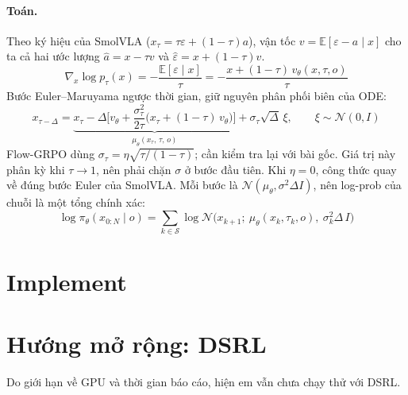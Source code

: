 \documentclass[11pt,a4paper]{article}
\newcommand{\Normal}{\mathcal{N}}
\newcommand{\Sset}{\mathcal{S}}
\begin{document}
\paragraph{Toán.}
Theo ký hiệu của SmolVLA ($x_\tau = \tau\varepsilon + (1 - \tau)a$), vận tốc $v = \mathbb{E}[\varepsilon - a \mid x]$ cho ta cả hai ước lượng $\hat a = x - \tau v$ và $\hat\varepsilon = x + (1 - \tau)v$.
\begin{equation}
  \nabla_x \log p_\tau(x) = -\frac{\mathbb{E}[\varepsilon \mid x]}{\tau} = -\frac{x + (1-\tau)\,v_\theta(x,\tau,o)}{\tau}
\end{equation}
Bước Euler--Maruyama ngược thời gian, giữ nguyên phân phối biên của ODE:
\begin{equation}
  x_{\tau-\Delta} = \underbrace{x_\tau - \Delta\Big[v_\theta + \frac{\sigma_\tau^2}{2\tau}\big(x_\tau + (1-\tau)\,v_\theta\big)\Big]}_{\mu_\theta(x_\tau,\,\tau,\,o)} + \sigma_\tau\sqrt{\Delta}\,\xi, \qquad \xi \sim \Normal(0, I)
\end{equation}
Flow-GRPO dùng $\sigma_\tau = \eta\sqrt{\tau/(1 - \tau)}$; cần kiểm tra lại với bài gốc. Giá trị này phân kỳ khi $\tau \to 1$, nên phải chặn $\sigma$ ở bước đầu tiên. Khi $\eta = 0$, công thức quay về đúng bước Euler của SmolVLA. Mỗi bước là $\Normal(\mu_\theta, \sigma^2\Delta I)$, nên log-prob của chuỗi là một tổng chính xác:
\begin{equation}
  \log \pi_\theta(x_{0:N} \mid o) = \sum_{k \in \Sset} \log \Normal\big(x_{k+1};\ \mu_\theta(x_k, \tau_k, o),\ \sigma_k^2 \Delta\, I\big)
\end{equation}

\section{Implement}

\section{Hướng mở rộng: DSRL}

Do giới hạn về GPU và thời gian báo cáo, hiện em vẫn chưa chạy thử với DSRL.
\end{document}
